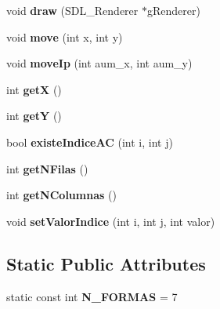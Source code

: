 \begin{DoxyCompactItemize}
\item 
void {\bfseries draw} (S\+D\+L\+\_\+\+Renderer $\ast$g\+Renderer)\hypertarget{class_tetromino_a0dc11b22260f1c4ead3ab779d809c2df}{}\label{class_tetromino_a0dc11b22260f1c4ead3ab779d809c2df}

\item 
void {\bfseries move} (int x, int y)\hypertarget{class_tetromino_a27b5075a10a352c156baba9a88d604fe}{}\label{class_tetromino_a27b5075a10a352c156baba9a88d604fe}

\item 
void {\bfseries move\+Ip} (int aum\+\_\+x, int aum\+\_\+y)\hypertarget{class_tetromino_a565cc0db8325cf618c8cc43f852bde6c}{}\label{class_tetromino_a565cc0db8325cf618c8cc43f852bde6c}

\item 
int {\bfseries getX} ()\hypertarget{class_tetromino_a2e1c98b4562885335aa587ba44f5a37d}{}\label{class_tetromino_a2e1c98b4562885335aa587ba44f5a37d}

\item 
int {\bfseries getY} ()\hypertarget{class_tetromino_a4d7ba9bc643fa201a0ab3d5927ab551e}{}\label{class_tetromino_a4d7ba9bc643fa201a0ab3d5927ab551e}

\item 
bool {\bfseries existe\+Indice\+AC} (int i, int j)\hypertarget{class_tetromino_a838ed35cdf4c976dda0ae06d44c2e38c}{}\label{class_tetromino_a838ed35cdf4c976dda0ae06d44c2e38c}

\item 
int {\bfseries get\+N\+Filas} ()\hypertarget{class_tetromino_aeeb734e4e416331864b39e23fed136ac}{}\label{class_tetromino_aeeb734e4e416331864b39e23fed136ac}

\item 
int {\bfseries get\+N\+Columnas} ()\hypertarget{class_tetromino_ae7de3bdb5aaf49d32ce60d6d11f5cdf9}{}\label{class_tetromino_ae7de3bdb5aaf49d32ce60d6d11f5cdf9}

\item 
void {\bfseries set\+Valor\+Indice} (int i, int j, int valor)\hypertarget{class_tetromino_ae9830084eb1fb4d70fdf495630e83d6b}{}\label{class_tetromino_ae9830084eb1fb4d70fdf495630e83d6b}

\end{DoxyCompactItemize}
\subsection*{Static Public Attributes}
\begin{DoxyCompactItemize}
\item 
static const int {\bfseries N\+\_\+\+F\+O\+R\+M\+AS} = 7\hypertarget{class_tetromino_a3e809f79bde227a77e2280abc7ae0069}{}\label{class_tetromino_a3e809f79bde227a77e2280abc7ae0069}

\end{DoxyCompactItemize}


